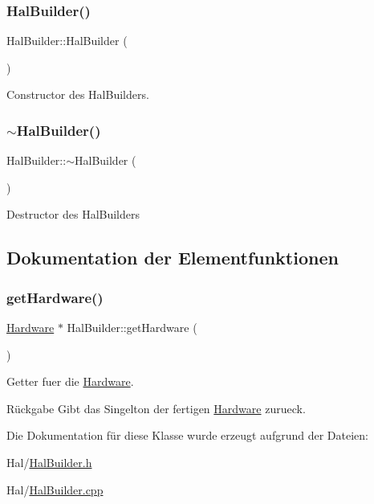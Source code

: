 \subsubsection{\texorpdfstring{Hal\+Builder()}{HalBuilder()}}
{\footnotesize\ttfamily Hal\+Builder\+::\+Hal\+Builder (\begin{DoxyParamCaption}{ }\end{DoxyParamCaption})}

Constructor des Hal\+Builders. \hypertarget{class_hal_builder_af77e28e213c8aa028b18cf435e9ef3c8}{}\label{class_hal_builder_af77e28e213c8aa028b18cf435e9ef3c8} 
\subsubsection{\texorpdfstring{$\sim$\+Hal\+Builder()}{~HalBuilder()}}
{\footnotesize\ttfamily Hal\+Builder\+::$\sim$\+Hal\+Builder (\begin{DoxyParamCaption}{ }\end{DoxyParamCaption})\hspace{0.3cm}{\ttfamily [virtual]}}

Destructor des Hal\+Builders 

\subsection{Dokumentation der Elementfunktionen}
\hypertarget{class_hal_builder_addc8f400dfa9dee3f0d9de116512212f}{}\label{class_hal_builder_addc8f400dfa9dee3f0d9de116512212f} 
\subsubsection{\texorpdfstring{get\+Hardware()}{getHardware()}}
{\footnotesize\ttfamily \hyperlink{class_hardware}{Hardware} $\ast$ Hal\+Builder\+::get\+Hardware (\begin{DoxyParamCaption}{ }\end{DoxyParamCaption})}

Getter fuer die \hyperlink{class_hardware}{Hardware}.

\begin{DoxyReturn}{Rückgabe}
Gibt das Singelton der fertigen \hyperlink{class_hardware}{Hardware} zurueck. 
\end{DoxyReturn}


Die Dokumentation für diese Klasse wurde erzeugt aufgrund der Dateien\+:\begin{DoxyCompactItemize}
\item 
Hal/\hyperlink{_hal_builder_8h}{Hal\+Builder.\+h}\item 
Hal/\hyperlink{_hal_builder_8cpp}{Hal\+Builder.\+cpp}\end{DoxyCompactItemize}
